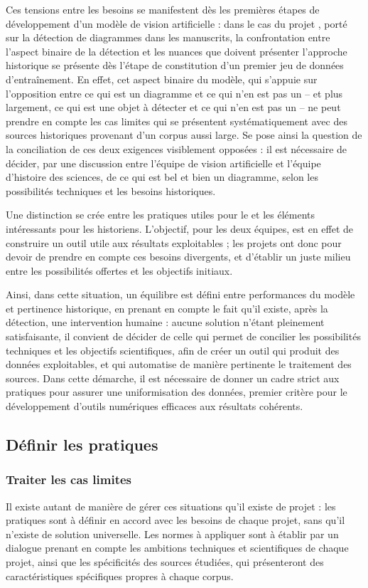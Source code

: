 Ces tensions entre les besoins se manifestent dès les premières étapes de développement d'un modèle de vision artificielle : dans le cas du projet \eida, porté sur la détection de diagrammes dans les manuscrits, la confrontation entre l'aspect binaire de la détection et les nuances que doivent présenter l'approche historique se présente dès l'étape de constitution d'un premier jeu de données d'entraînement. En effet, cet aspect binaire du modèle, qui s'appuie sur l'opposition entre ce qui est un diagramme et ce qui n'en est pas un -- et plus largement, ce qui est une objet à détecter et ce qui n'en est pas un -- ne peut prendre en compte les cas limites qui se présentent systématiquement avec des sources historiques provenant d'un corpus aussi large. Se pose ainsi la question de la conciliation de ces deux exigences visiblement opposées : il est nécessaire de décider, par une discussion entre l'équipe de vision artificielle et l'équipe d'histoire des sciences, de ce qui est bel et bien un diagramme, selon les possibilités techniques et les besoins historiques.

Une distinction se crée entre les pratiques utiles pour le \dl et les éléments intéressants pour les historiens. L'objectif, pour les deux équipes, est en effet de construire un outil utile aux résultats exploitables ; les projets ont donc pour devoir de prendre en compte ces besoins divergents, et d'établir un juste milieu entre les possibilités offertes et les objectifs initiaux. 

Ainsi, dans cette situation, un équilibre est défini entre performances du modèle et pertinence historique, en prenant en compte le fait qu'il existe, après la détection, une intervention humaine : aucune solution n'étant pleinement satisfaisante, il convient de décider de celle qui permet de concilier les possibilités techniques et les objectifs scientifiques, afin de créer un outil qui produit des données exploitables, et qui automatise de manière pertinente le traitement des sources. Dans cette démarche, il est nécessaire de donner un cadre strict aux pratiques pour assurer une uniformisation des données, premier critère pour le développement d'outils numériques efficaces aux résultats cohérents.
    
    \subsection{Définir les pratiques}
        \subsubsection{Traiter les cas limites}
Il existe autant de manière de gérer ces situations qu'il existe de projet : les pratiques sont à définir en accord avec les besoins de chaque projet, sans qu'il n'existe de solution universelle. Les normes à appliquer sont à établir par un dialogue prenant en compte les ambitions techniques et scientifiques de chaque projet, ainsi que les spécificités des sources étudiées, qui présenteront des caractéristiques spécifiques propres à chaque corpus.

